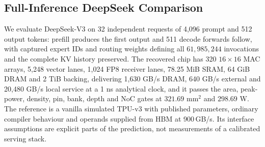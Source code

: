 \subsection{Full-Inference DeepSeek Comparison}
\label{sec:decode_decomp}\label{sec:batch_sensitivity}
We evaluate DeepSeek-V3 on 32 independent requests of 4,096 prompt and 512 output tokens: prefill produces the first output and 511 decode forwards follow, with captured expert IDs and routing weights defining all $61{,}985{,}244$ invocations and the complete KV history preserved.
The recovered chip has 320 $16\times16$ MAC arrays, 5,248 vector lanes, 1,024 FP8 receiver lanes, 78.25 MiB SRAM, 64 GiB DRAM and 2 TiB backing, delivering 1,630 GB/s DRAM, 640 GB/s external and 20,480 GB/s local service at a 1 ns analytical clock, and it passes the area, peak-power, density, pin, bank, depth and NoC gates at $321.69$ mm$^2$ and $298.69$ W. The reference is a vanilla simulated TPU-v3 with published parameters, ordinary compiler behaviour and operands supplied from HBM at 900\,GB/s.
Its interface assumptions are explicit parts of the prediction, not measurements of a calibrated serving stack.

